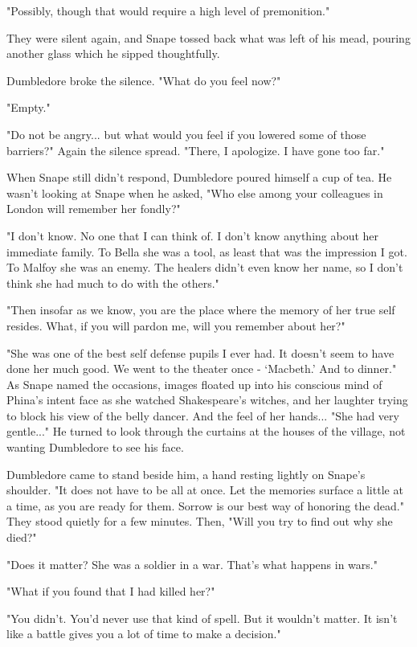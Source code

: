 "Possibly, though that would require a high level of premonition."

They were silent again, and Snape tossed back what was left of his mead, pouring another glass which he sipped thoughtfully.

Dumbledore broke the silence. "What do you feel now?"

"Empty."

"Do not be angry... but what would you feel if you lowered some of those barriers?" Again the silence spread. "There, I apologize. I have gone too far."

When Snape still didn't respond, Dumbledore poured himself a cup of tea. He wasn't looking at Snape when he asked, "Who else among your colleagues in London will remember her fondly?"

"I don't know. No one that I can think of. I don't know anything about her immediate family. To Bella she was a tool, as least that was the impression I got. To Malfoy she was an enemy. The healers didn't even know her name, so I don't think she had much to do with the others."

"Then insofar as we know, you are the place where the memory of her true self resides. What, if you will pardon me, will you remember about her?"

"She was one of the best self defense pupils I ever had. It doesn't seem to have done her much good. We went to the theater once - `Macbeth.' And to dinner." As Snape named the occasions, images floated up into his conscious mind of Phina's intent face as she watched Shakespeare's witches, and her laughter trying to block his view of the belly dancer. And the feel of her hands... "She had very gentle..." He turned to look through the curtains at the houses of the village, not wanting Dumbledore to see his face.

Dumbledore came to stand beside him, a hand resting lightly on Snape's shoulder. "It does not have to be all at once. Let the memories surface a little at a time, as you are ready for them. Sorrow is our best way of honoring the dead." They stood quietly for a few minutes. Then, "Will you try to find out why she died?"

"Does it matter? She was a soldier in a war. That's what happens in wars."

"What if you found that I had killed her?"

"You didn't. You'd never use that kind of spell. But it wouldn't matter. It isn't like a battle gives you a lot of time to make a decision."

